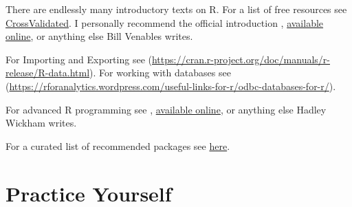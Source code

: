 \documentclass[]{book}
\theoremstyle{definition}
\theoremstyle{definition}
\theoremstyle{definition}
\theoremstyle{remark}
\begin{document}
There are endlessly many introductory texts on R. For a list of free
resources see
\href{http://stats.stackexchange.com/questions/138/free-resources-for-learning-r}{CrossValidated}.
I personally recommend the official introduction
\citet{venables2004introduction},
\href{https://cran.r-project.org/doc/manuals/r-release/R-intro.pdf}{available
online}, or anything else Bill Venables writes.

For Importing and Exporting see
(\url{https://cran.r-project.org/doc/manuals/r-release/R-data.html}).
For working with databases see
(\url{https://rforanalytics.wordpress.com/useful-links-for-r/odbc-databases-for-r/}).

For advanced R programming see \citet{wickham2014advanced},
\href{http://adv-r.had.co.nz/}{available online}, or anything else
Hadley Wickham writes.

For a curated list of recommended packages see
\href{https://github.com/rstudio/RStartHere/blob/master/README.md}{here}.

\section{Practice Yourself}\label{practice-yourself}
\end{document}
